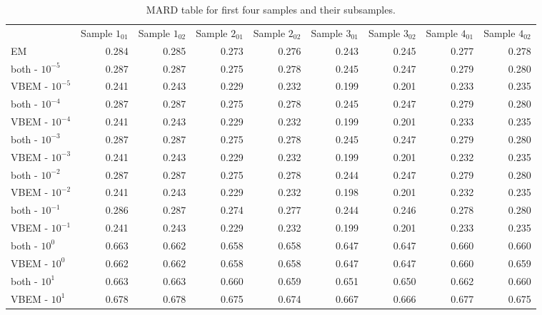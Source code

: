   \begin{table}[t]
    \caption{MARD table for first four samples and their subsamples.}
    \label{mardtable}
    \tabcolsep=0pt%
    \begin{tabular*}{\textwidth}{@{\extracolsep{\fill}}lrrrrrrrr@{\extracolsep{\fill}}}
    \toprule%
    \textbf{} &
    \multicolumn{1}{l}{Sample $1_{01}$} &
    \multicolumn{1}{l}{Sample $1_{02}$} &
    \multicolumn{1}{l}{Sample $2_{01}$} &
    \multicolumn{1}{l}{Sample $2_{02}$} &
    \multicolumn{1}{l}{Sample $3_{01}$} &
    \multicolumn{1}{l}{Sample $3_{02}$} &
    \multicolumn{1}{l}{Sample $4_{01}$} &
    \multicolumn{1}{l}{Sample $4_{02}$} \\
  EM           & 0.284 & 0.285 & 0.273 & 0.276 & 0.243 & 0.245 & 0.277 & 0.278 \\
  both - $10^{-5}$ & 0.287 & 0.287 & 0.275 & 0.278 & 0.245 & 0.247 & 0.279 & 0.280 \\
  VBEM - $10^{-5}$ & 0.241 & 0.243 & 0.229 & 0.232 & 0.199 & 0.201 & 0.233 & 0.235 \\
  both - $10^{-4}$ & 0.287 & 0.287 & 0.275 & 0.278 & 0.245 & 0.247 & 0.279 & 0.280 \\
  VBEM - $10^{-4}$ & 0.241 & 0.243 & 0.229 & 0.232 & 0.199 & 0.201 & 0.233 & 0.235 \\
  both - $10^{-3}$ & 0.287 & 0.287 & 0.275 & 0.278 & 0.245 & 0.247 & 0.279 & 0.280 \\
  VBEM - $10^{-3}$ & 0.241 & 0.243 & 0.229 & 0.232 & 0.199 & 0.201 & 0.232 & 0.235 \\
  both - $10^{-2}$ & 0.287 & 0.287 & 0.275 & 0.278 & 0.244 & 0.247 & 0.279 & 0.280 \\
  VBEM - $10^{-2}$ & 0.241 & 0.243 & 0.229 & 0.232 & 0.198 & 0.201 & 0.232 & 0.235 \\
  both - $10^{-1}$ & 0.286 & 0.287 & 0.274 & 0.277 & 0.244 & 0.246 & 0.278 & 0.280 \\
  VBEM - $10^{-1}$ & 0.241 & 0.243 & 0.229 & 0.232 & 0.199 & 0.201 & 0.233 & 0.235 \\
  both - $10^0$  & 0.663 & 0.662 & 0.658 & 0.658 & 0.647 & 0.647 & 0.660 & 0.660 \\
  VBEM - $10^0$  & 0.662 & 0.662 & 0.658 & 0.658 & 0.647 & 0.647 & 0.660 & 0.659 \\
  both - $10^1$  & 0.663 & 0.663 & 0.660 & 0.659 & 0.651 & 0.650 & 0.662 & 0.660 \\
  VBEM - $10^1$  & 0.678 & 0.678 & 0.675 & 0.674 & 0.667 & 0.666 & 0.677 & 0.675

    \botrule
    \end{tabular*}
    \end{table}
  

